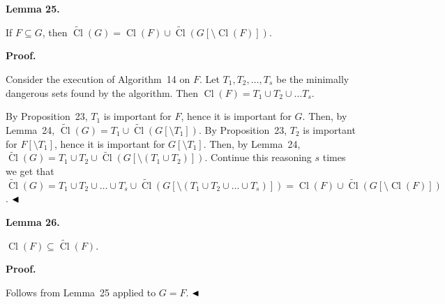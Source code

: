 \documentclass[10pt,a4paper]{article}
\begin{document}
\par\medskip\noindent\textbf{
Lemma 25.
}\par



If $F\subseteq G$, then $\widetilde{\mathop{\mathrm{Cl}}}(G)=\mathop{\mathrm{Cl}}(F)\cup\widetilde{\mathop{\mathrm{Cl}}}(G[\setminus\mathop{\mathrm{Cl}}(F)])$.\par



\par\medskip\noindent\textbf{Proof.}\par


Consider the execution of Algorithm 14 on $F$.
Let $T_{1},T_{2},\dots,T_{s}$ be the minimally dangerous sets found by the algorithm. Then $\mathop{\mathrm{Cl}}(F)=T_{1}\cup T_{2}\cup\dots T_{s}$.\par



By Proposition 23, $T_{1}$ is important for $F$, hence it is important for $G$. Then, by Lemma 24, $\widetilde{\mathop{\mathrm{Cl}}}(G)=T_{1}\cup\widetilde{\mathop{\mathrm{Cl}}}(G[\setminus T_{1}])$. By Proposition 23, $T_{2}$ is important for $F[\setminus T_{1}]$, hence it is important for $G[\setminus T_{1}]$. Then, by Lemma 24, $\widetilde{\mathop{\mathrm{Cl}}}(G)=T_{1}\cup T_{2}\cup\widetilde{\mathop{\mathrm{Cl}}}(G[\setminus(T_{1}\cup T_{2})])$. Continue this reasoning $s$ times we get that $\widetilde{\mathop{\mathrm{Cl}}}(G)=T_{1}\cup T_{2}\cup\dots\cup T_{s}\cup\widetilde{\mathop{\mathrm{Cl}}}(G[\setminus(T_{1}\cup T_{2}\cup\dots\cup T_{s})])=\mathop{\mathrm{Cl}}(F)\cup\widetilde{\mathop{\mathrm{Cl}}}(G[\setminus\mathop{\mathrm{Cl}}(F)])$.
$\hfill\blacktriangleleft$\par



\par\medskip\noindent\textbf{
Lemma 26.
}\par



$\mathop{\mathrm{Cl}}(F)\subseteq\widetilde{\mathop{\mathrm{Cl}}}(F)$.\par



\par\medskip\noindent\textbf{Proof.}\par


Follows from Lemma 25 applied to $G=F$.
$\hfill\blacktriangleleft$\par
\end{document}
